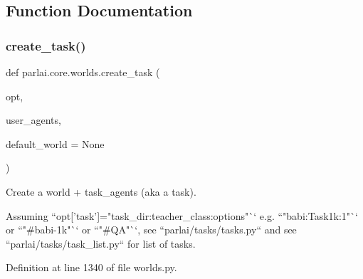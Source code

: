 \subsection{Function Documentation}
\mbox{\label{namespaceparlai_1_1core_1_1worlds_a11923c10b545c7ecc1b08fe2242d9c2c}} 
\subsubsection{\texorpdfstring{create\+\_\+task()}{create\_task()}}
{\footnotesize\ttfamily def parlai.\+core.\+worlds.\+create\+\_\+task (\begin{DoxyParamCaption}\item[{}]{opt,  }\item[{}]{user\+\_\+agents,  }\item[{}]{default\+\_\+world = {\ttfamily None} }\end{DoxyParamCaption})}

\begin{DoxyVerb}Create a world + task_agents (aka a task).

Assuming ``opt['task']="task_dir:teacher_class:options"`` e.g. ``"babi:Task1k:1"``
or ``"#babi-1k"`` or ``"#QA"``, see ``parlai/tasks/tasks.py`` and see
``parlai/tasks/task_list.py`` for list of tasks.
\end{DoxyVerb}
 

Definition at line 1340 of file worlds.\+py.


